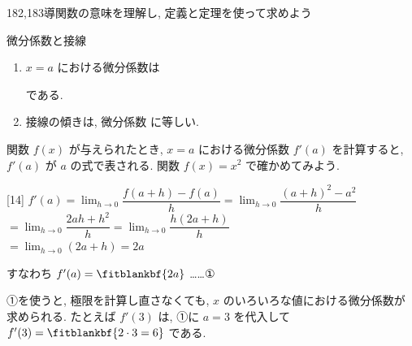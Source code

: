 \documentclass[14pt,dvipdfmx]{jsarticle}
\begin{document}
  {182,183}{導関数の意味を理解し, 定義と定理を使って求めよう}

\setcounter{definition}{4}

\vspace{-2.0zw}%
\vspace{-0.35em}
\begin{reviewbox}{微分係数と接線}
  \begin{enumerate}[label=\textbf{\arabic*}, leftmargin=1.5zw, itemsep=0.2em]
    \item $x=a$ における微分係数は
          \par\vspace{0.3em}
          {\renewcommand{\fitblankpad}{3zw}%
          }
          \mbox{である.}
          \par\vspace{0.5em}
    \item 接線の傾きは, 微分係数  に等しい.
  \end{enumerate}
\end{reviewbox}

\vspace{0.45em}
\vspace{-0.25em}
関数 $f(x)$ が与えられたとき, $x=a$ における微分係数 $f'(a)$ を計算すると,
$f'(a)$ が $a$ の式で表される.
関数 $f(x)=x^{2}$ で確かめてみよう.
\par\vspace{0.15em}
\begin{answerbox}{}[14]
  $f'(a)=\lim_{h \to 0}\dfrac{f(a+h)-f(a)}{h}
    =\lim_{h \to 0}\dfrac{(a+h)^{2}-a^{2}}{h}$\\[0.5em]
  $=\lim_{h \to 0}\dfrac{2ah+h^{2}}{h}
    =\lim_{h \to 0}\dfrac{h(2a+h)}{h}$\\[0.5em]
  $=\lim_{h \to 0}(2a+h)=2a$
\end{answerbox}
\vspace{1em}
すなわち $f'(a)=\fitblankbf{2a}$ ……①
\par\vspace{0.45em}
①を使うと, 極限を計算し直さなくても, $x$ のいろいろな値における微分係数が求められる.
たとえば $f'(3)$ は, ①に $a=3$ を代入して
$f'(3)=\fitblankbf{2\cdot 3=6}$ である.

\vfill
\nextpage
\end{document}
